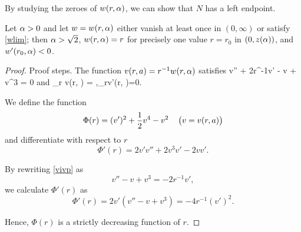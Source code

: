 % 
% 
By studying the zeroes of $w(r,\alpha)$, we can show that $N$ has a left endpoint.

\newcommand{\va}{v(r, a)}
\begin{lemma}\label{vlem}
Let $\alpha>0$ and let $w=w(r,\alpha)$ either vanish at least once in $(0, \infty)$ or
satisfy \eqref{wlim}; then $\alpha>\sqrt{2}$, $w(r, \alpha)=r$ for precisely one value
$r=r_0$ in $(0, z(\alpha))$, and $w'(r_0, \alpha)<0$.
\end{lemma}
\begin{proof}
{\red Proof steps.} The function $\va=r^{-1}w(r, \a)$ satisfies
\be\label{vivp} v'' + 2r^{-1}v' - v + v^3 = 0\ee
and
\be\label{vic} \lim_{r} v(r, \a) = \a,\quad \lim_{r}v'(r, \a)=0.\ee

We define the function
$$\Phi(r) = (v')^2 + \frac{1}{2} v^4 - v^2\quad\left(v=v(r, a)\right)$$
and differentiate with respect to $r$
$$\Phi'(r) = 2v'v'' + 2v^3v' - 2vv'.$$

By rewriting \eqref{vivp} as %
$$v'' - v + v^3 = -2r^{-1}v',$$
we calculate $\Phi'(r)$ as 
$$\Phi'(r) = 2v'\left(v'' - v + v^3\right)=-4r^{-1}(v')^2.$$

Hence, $\Phi(r)$ is a strictly decreasing function of $r$. 
%
%


\end{proof}
